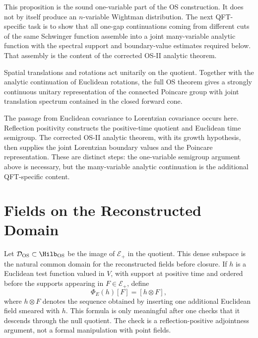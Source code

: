 This proposition is the sound one-variable part of the OS construction.  It
does not by itself produce an \(n\)-variable Wightman distribution.  The
next QFT-specific task is to show that all one-gap continuations coming
from different cuts of the same Schwinger function assemble into a joint
many-variable analytic function with the spectral support and boundary-value
estimates required below.  That assembly is the content of the corrected OS-II
analytic theorem.

Spatial translations and rotations act unitarily on the quotient.
Together with the analytic continuation of Euclidean rotations, the full OS
theorem gives a strongly continuous unitary representation of the connected
Poincare group with joint translation spectrum contained in the closed forward
cone.

The passage from Euclidean covariance to Lorentzian covariance occurs here.
Reflection positivity constructs the positive-time quotient and Euclidean time
semigroup.  The corrected OS-II analytic theorem, with its growth hypothesis,
then supplies the joint Lorentzian boundary values and the Poincare
representation.  These are distinct steps: the one-variable semigroup
argument above is necessary, but the many-variable analytic continuation is
the additional QFT-specific content.

\section{Fields on the Reconstructed Domain}

Let \(\mathcal D_{\rm OS}\subset\Hilb_{\rm OS}\) be the image of
\(\mathcal E_+\) in the quotient.  This dense subspace is the natural common
domain for the reconstructed fields before closure.  If \(h\) is a Euclidean
test function valued in \(V\), with support at positive time and ordered
before the supports appearing in \(F\in\mathcal E_+\), define
\[
  \Phi_E(h)[F]
  =
  [h\otimes F],
\]
where \(h\otimes F\) denotes the sequence obtained by inserting one additional
Euclidean field smeared with \(h\).  This formula is only meaningful after
one checks that it descends through the null quotient.  The check is a
reflection-positive adjointness argument, not a formal manipulation with
point fields.

